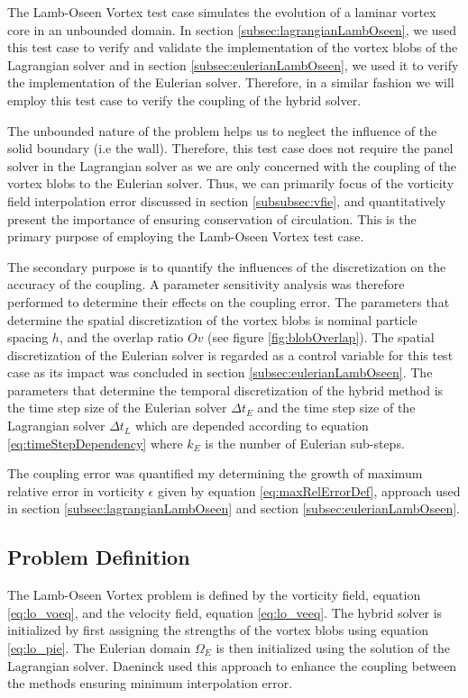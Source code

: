The Lamb-Oseen Vortex test case simulates the evolution of a laminar vortex core in an unbounded domain. In section \ref{subsec:lagrangianLambOseen}, we used this test case to verify and validate the implementation of the vortex blobs of the Lagrangian solver and in section \ref{subsec:eulerianLambOseen}, we used it to verify the implementation of the Eulerian solver. Therefore, in a similar fashion we will employ this test case to verify the coupling of the hybrid solver. 

The unbounded nature of the problem helps us to neglect the influence of the solid boundary (i.e the wall). Therefore, this test case does not require the panel solver in the Lagrangian solver as we are only concerned with the coupling of the vortex blobs to the Eulerian solver. Thus, we can primarily focus of the vorticity field interpolation error discussed in section \ref{subsubsec:vfie}, and quantitatively present the importance of ensuring conservation of circulation. This is the primary purpose of employing the Lamb-Oseen Vortex test case.

The secondary purpose is to quantify the influences of the discretization on the accuracy of the coupling. A parameter sensitivity analysis was therefore performed to determine their effects on the coupling error. The parameters that determine the spatial discretization of the vortex blobs is nominal particle spacing $h$, and the overlap ratio $Ov$ (see figure \ref{fig:blobOverlap}). The spatial discretization of the Eulerian solver is regarded as a control variable for this test case as its impact was concluded in section \ref{subsec:eulerianLambOseen}. The parameters that determine the temporal discretization of the hybrid method is the time step size of the Eulerian solver $\Delta t_E$ and the time step size of the Lagrangian solver $\Delta t_L$ which are depended according to equation \ref{eq:timeStepDependency} where $k_E$ is the number of Eulerian sub-steps.

The coupling error was quantified my determining the growth of maximum relative error in vorticity $\epsilon$ given by equation \ref{eq:maxRelErrorDef}, approach used in section \ref{subsec:lagrangianLambOseen} and section \ref{subsec:eulerianLambOseen}. 


\subsection{Problem Definition}

The Lamb-Oseen Vortex problem is defined by the vorticity field, equation \ref{eq:lo_voeq}, and the velocity field, equation \ref{eq:lo_veeq}. The hybrid solver is initialized by first assigning the strengths of the vortex blobs using equation \ref{eq:lo_pie}. The Eulerian domain $\Omega_E$ is then initialized using the solution of the Lagrangian solver. Daeninck \cite{Daeninck2006} used this approach to enhance the coupling between the methods ensuring minimum interpolation error.

